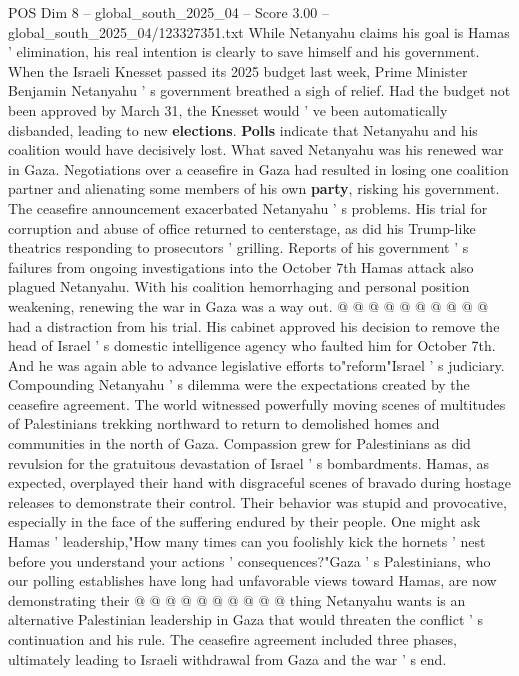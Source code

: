 \begin{textsample}{POS Dim 8 – global\_south\_2025\_04 – Score 3.00 – global\_south\_2025\_04/123327351.txt}  \label{ex:f8_pos_418}
While Netanyahu claims his goal is Hamas ' elimination, his real intention is clearly to save himself and his government.
When the Israeli Knesset passed its 2025 budget last week, Prime Minister Benjamin Netanyahu ' s government breathed a sigh of relief.
Had the budget not been approved by March 31, the Knesset would ' ve been automatically disbanded, leading to new \textbf{elections}. \textbf{Polls} indicate that Netanyahu and his coalition would have decisively lost.
What saved Netanyahu was his renewed war in Gaza.
Negotiations over a ceasefire in Gaza had resulted in losing one coalition partner and alienating some members of his own \textbf{party}, risking his government.
The ceasefire announcement exacerbated Netanyahu ' s problems.
His trial for corruption and abuse of office returned to centerstage, as did his Trump-like theatrics responding to prosecutors ' grilling.
Reports of his government ' s failures from ongoing investigations into the October 7th Hamas attack also plagued Netanyahu.
With his coalition hemorrhaging and personal position weakening, renewing the war in Gaza was a way out. @ @ @ @ @ @ @ @ @ @ had a distraction from his trial.
His cabinet approved his decision to remove the head of Israel ' s domestic intelligence agency who faulted him for October 7th.
And he was again able to advance legislative efforts to"reform"Israel ' s judiciary.
Compounding Netanyahu ' s dilemma were the expectations created by the ceasefire agreement.
The world witnessed powerfully moving scenes of multitudes of Palestinians trekking northward to return to demolished homes and communities in the north of Gaza.
Compassion grew for Palestinians as did revulsion for the gratuitous devastation of Israel ' s bombardments.
Hamas, as expected, overplayed their hand with disgraceful scenes of bravado during hostage releases to demonstrate their control.
Their behavior was stupid and provocative, especially in the face of the suffering endured by their people.
One might ask Hamas ' leadership,"How many times can you foolishly kick the hornets ' nest before you understand your actions ' consequences?"Gaza ' s Palestinians, who our polling establishes have long had unfavorable views toward Hamas, are now demonstrating their @ @ @ @ @ @ @ @ @ @ thing Netanyahu wants is an alternative Palestinian leadership in Gaza that would threaten the conflict ' s continuation and his rule.
The ceasefire agreement included three phases, ultimately leading to Israeli withdrawal from Gaza and the war ' s end.

\end{textsample}
